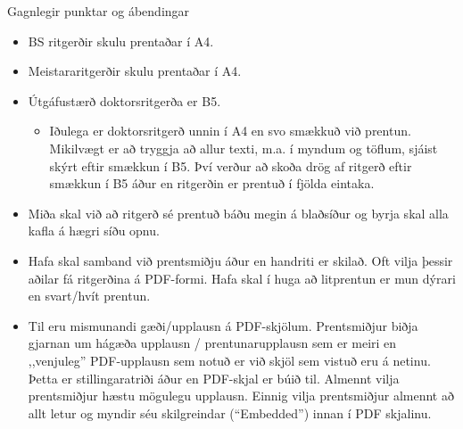 \documentclass[a4paper,12pt,twoside,BCOR=10mm]{scrbook}
\begin{document}
Gagnlegir punktar og ábendingar
\begin{itemize}
 \item BS ritgerðir skulu prentaðar í A4.
 \item Meistararitgerðir skulu prentaðar í A4.
 \item Útgáfustærð doktorsritgerða er B5.
\begin{itemize}
 \item[-] Iðulega er doktorsritgerð unnin í A4 en svo smækkuð við prentun. Mikilvægt er að tryggja að allur texti, m.a. í myndum og töflum, sjáist skýrt eftir smækkun í B5. Því verður að skoða drög af ritgerð eftir smækkun í B5 áður en ritgerðin er prentuð í fjölda eintaka.
\end{itemize}

\end{itemize}

\begin{itemize}
 \item Miða skal við að ritgerð sé prentuð báðu megin á blaðsíður og byrja skal alla kafla á hægri síðu opnu.
 \item Hafa skal samband við prentsmiðju áður en handriti er skilað. Oft vilja þessir aðilar fá ritgerðina á PDF-formi. Hafa skal í huga að litprentun er mun dýrari en svart/hvít prentun. 
 \item Til eru mismunandi gæði/upplausn á PDF-skjölum. Prentsmiðjur biðja gjarnan um hágæða upplausn / prentunarupplausn sem er meiri en ,,venjuleg” PDF-upplausn sem notuð er við skjöl sem vistuð eru á netinu. Þetta er stillingaratriði áður en PDF-skjal er búið til. Almennt vilja prentsmiðjur hæstu mögulegu upplausn. Einnig vilja prentsmiðjur almennt að allt letur og myndir séu skilgreindar (“Embedded”) innan í PDF skjalinu.
\end{itemize}
\end{document}
